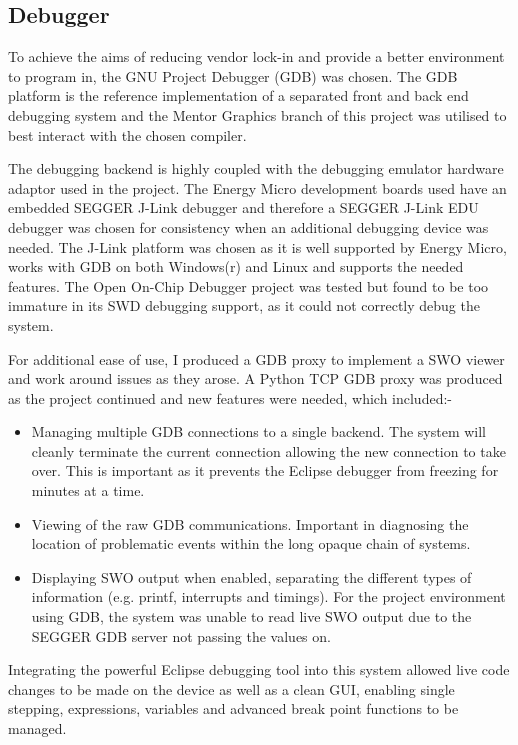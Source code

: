 \subsection{Debugger}
To achieve the aims of reducing vendor lock-in and provide a better environment to program in, the
GNU Project Debugger (GDB) was chosen. The GDB platform is the reference implementation of a
separated front and back end debugging system and the Mentor Graphics branch of this project was
utilised to best interact with the chosen compiler.


The debugging backend is highly coupled with the debugging emulator hardware adaptor used in the
project. The Energy Micro development boards used have an embedded SEGGER J-Link debugger
and therefore a SEGGER J-Link EDU debugger was chosen for consistency when an additional
debugging device was needed. The J-Link platform was chosen as it is well supported by Energy
Micro, works with GDB on both Windows(r) and Linux and supports the needed features. The Open
On-Chip Debugger project was tested but found to be too immature in its SWD debugging support,
as it could not correctly debug the system.


For additional ease of use, I produced a GDB proxy to implement a SWO viewer and work around
issues as they arose. A Python TCP GDB proxy was produced as the project continued and new
features were needed, which included:-
\begin{itemize}
  \item Managing multiple GDB connections to a single backend. The system will cleanly terminate
        the current connection allowing the new connection to take over. This is important as it
        prevents the Eclipse debugger from freezing for minutes at a time.
  \item Viewing of the raw GDB communications. Important in diagnosing the location of
        problematic events within the long opaque chain of systems.
  \item Displaying SWO output when enabled, separating the different types of information (e.g.
        printf, interrupts and timings). For the project environment using GDB, the system was
        unable to read live SWO output due to the SEGGER GDB server not passing the values on.
\end{itemize}


Integrating the powerful Eclipse debugging tool into this system allowed live code changes to be
made on the device as well as a clean GUI, enabling single stepping, expressions, variables and
advanced break point functions to be managed.


